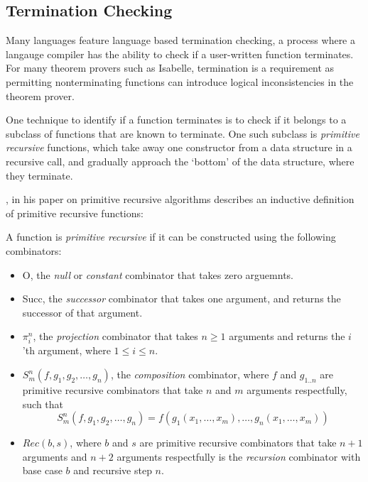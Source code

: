 \subsection{Termination Checking}

Many languages feature language based termination checking, a process
where a langauge compiler has the ability to check if a user-written function
terminates. For many theorem provers such as Isabelle, 
termination is a requirement as permitting nonterminating functions
can introduce logical inconsistencies in the theorem prover.

One technique to identify if a function terminates is to check if it belongs
to a subclass of functions that are known to terminate. One such subclass
is \textit{primitive recursive} functions, which take away one constructor
from a data structure in a recursive call, and gradually approach the
`bottom' of the data structure, where they terminate.

\citet{AboutPrimrecAlgorithms}, in his paper on primitive recursive algorithms 
describes an inductive definition of primitive recursive functions:

\theoremstyle{definition}
\begin{definition}
    \label{def:primrec}
    A function is \textit{primitive recursive} if it can be constructed using 
    the following combinators:

    \begin{itemize}
        \item 
            \textsf{O}, the \textit{null} or \textit{constant} combinator that takes zero arguemnts.
        \item 
            \textsf{Succ}, the \textit{successor} combinator that takes one argument, and returns the successor
            of that argument.
        \item 
            \textsf{$\pi^n_i$}, the \textit{projection} combinator that takes $n \geq 1$ arguments and returns
            the $i$'th argument, where $1 \leq i \leq n$.
        \item 
            \textsf{$S^n_m(f, g_1, g_2, \dots, g_n)$}, the \textit{composition} combinator, where $f$ and $g_{1..n}$ are 
            primitive recursive combinators that take $n$ and $m$ arguments respectfully, such that 
                $$S^n_m(f, g_1, g_2, \dots, g_n) = f(g_1(x_1, \dots, x_m), \dots, g_n(x_1, \dots, x_m))$$
        \item 
            \textsf{$Rec(b,s)$}, where $b$ and $s$ are primitive recursive combinators that take
            $n + 1$ arguments and $n + 2$ arguments respectfully is the \textit{recursion}
            combinator with base case $b$ and recursive step $n$.
    \end{itemize}
\end{definition}

